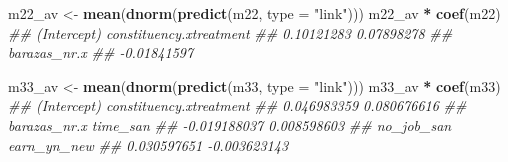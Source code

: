 \documentclass[
]{article}
\newenvironment{Shaded}{\begin{snugshade}}{\end{snugshade}}
\newcommand{\CommentTok}[1]{\textcolor[rgb]{0.56,0.35,0.01}{\textit{#1}}}
\newcommand{\DataTypeTok}[1]{\textcolor[rgb]{0.13,0.29,0.53}{#1}}
\newcommand{\KeywordTok}[1]{\textcolor[rgb]{0.13,0.29,0.53}{\textbf{#1}}}
\newcommand{\NormalTok}[1]{#1}
\newcommand{\OperatorTok}[1]{\textcolor[rgb]{0.81,0.36,0.00}{\textbf{#1}}}
\newcommand{\StringTok}[1]{\textcolor[rgb]{0.31,0.60,0.02}{#1}}
\begin{document}
\begin{Shaded}
\begin{Highlighting}[]
{{{{\NormalTok{m22_av <-}\StringTok{ }\KeywordTok{mean}\NormalTok{(}\KeywordTok{dnorm}\NormalTok{(}\KeywordTok{predict}\NormalTok{(m22, }\DataTypeTok{type =} \StringTok{"link"}\NormalTok{)))}
\NormalTok{m22_av }\OperatorTok{*}\StringTok{ }\KeywordTok{coef}\NormalTok{(m22)}
\CommentTok{##             (Intercept) constituency.xtreatment }
\CommentTok{##              0.10121283              0.07898278 }
\CommentTok{##            barazas_nr.x }
\CommentTok{##             -0.01841597}

\NormalTok{m33_av <-}\StringTok{ }\KeywordTok{mean}\NormalTok{(}\KeywordTok{dnorm}\NormalTok{(}\KeywordTok{predict}\NormalTok{(m33, }\DataTypeTok{type =} \StringTok{"link"}\NormalTok{)))}
\NormalTok{m33_av }\OperatorTok{*}\StringTok{ }\KeywordTok{coef}\NormalTok{(m33)}
\CommentTok{##             (Intercept) constituency.xtreatment }
\CommentTok{##             0.046983359             0.080676616 }
\CommentTok{##            barazas_nr.x                time_san }
\CommentTok{##            -0.019188037             0.008598603 }
\CommentTok{##              no_job_san             earn_yn_new }
\CommentTok{##             0.030597651            -0.003623143}

 


}}}}
\end{Highlighting}
\end{Shaded}
\end{document}
